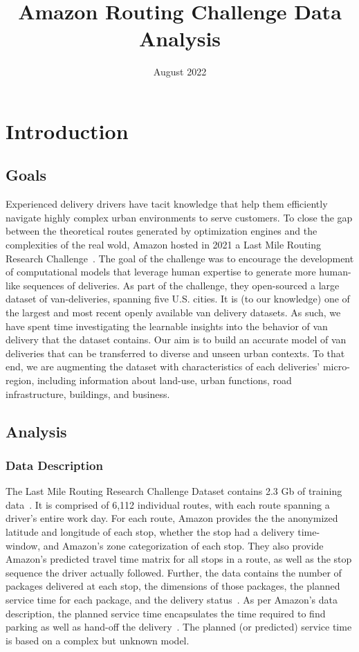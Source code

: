 \documentclass[12pt]{article}
\title{Amazon Routing Challenge Data Analysis}
\author{}
\date{August 2022}
\theoremstyle{plain}
\numberwithin{equation}{section}
\begin{document}
\maketitle

\section{Introduction}

\subsection{Goals}

Experienced delivery drivers have tacit knowledge that help them efficiently navigate highly complex urban environments to serve customers. To close the gap between the theoretical routes generated by optimization engines and the complexities of the real wold, Amazon hosted in 2021 a Last Mile Routing Research Challenge~\cite{winkenbach_technical_2021}. The goal of the challenge was to encourage the development of computational models that leverage human expertise to generate more human-like sequences of deliveries. As part of the challenge, they open-sourced a large dataset of van-deliveries, spanning five U.S. cities. It is (to our knowledge) one of the largest and most recent openly available van delivery datasets. As such, we have spent time investigating the learnable insights into the behavior of van delivery that the dataset contains. Our aim is to build an accurate model of van deliveries that can be transferred to diverse and unseen urban contexts. To that end, we are augmenting the dataset with characteristics of each deliveries' micro-region, including information about land-use, urban functions, road infrastructure, buildings, and business. 

\subsection{Analysis}

\subsubsection{Data Description}

The Last Mile Routing Research Challenge Dataset contains 2.3 Gb of training data~\cite{amazon_dataset}. It is comprised of 6,112 individual routes, with each route spanning a driver's entire work day. For each route, Amazon provides the the anonymized latitude and longitude of each stop, whether the stop had a delivery time-window, and Amazon's zone categorization of each stop. They also provide Amazon's predicted travel time matrix for all stops in a route, as well as the stop sequence the driver actually followed. Further, the data contains the number of packages delivered at each stop, the dimensions of those packages, the planned service time for each package, and the delivery status~\cite{amazon_dataset}. As per Amazon's data description, the planned service time encapsulates the time required to find parking as well as hand-off the delivery~\cite{amazon_dataset}. The planned (or predicted) service time is based on a complex but unknown model. 
\end{document}
